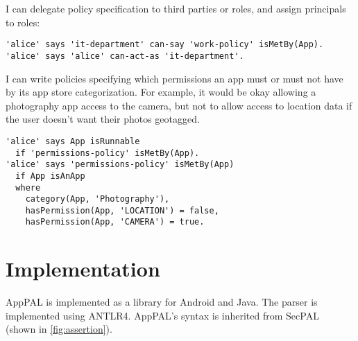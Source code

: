 \documentclass[thesis.tex]{subfiles}
\begin{document}
I can delegate policy specification to third parties or roles, and assign principals to roles:

\begin{lstlisting}
'alice' says 'it-department' can-say 'work-policy' isMetBy(App).
'alice' says 'alice' can-act-as 'it-department'.
\end{lstlisting}

I can write policies specifying which permissions an app must or must not have
by its app store categorization. For example, it would be okay allowing a
photography app access to the camera, but not to allow access to location data
if the user doesn't want their photos geotagged.

\begin{lstlisting}
'alice' says App isRunnable
  if 'permissions-policy' isMetBy(App).
'alice' says 'permissions-policy' isMetBy(App)
  if App isAnApp
  where
    category(App, 'Photography'),
    hasPermission(App, 'LOCATION') = false,
    hasPermission(App, 'CAMERA') = true.
\end{lstlisting}

\section{Implementation}

AppPAL is implemented as a library for Android and Java.
The parser is implemented using ANTLR4.
AppPAL's syntax is inherited from SecPAL~\cite{becker_secpal:_2010} (shown in \autoref{fig:assertion}).
\end{document}
